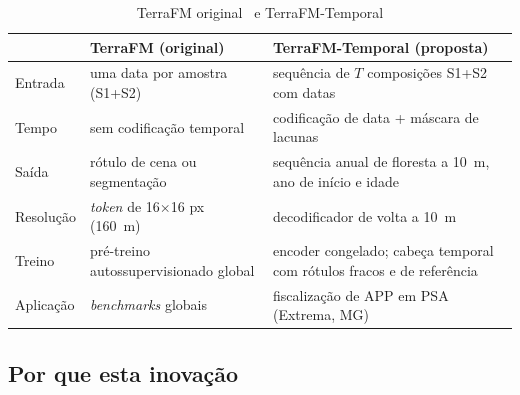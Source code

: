 \documentclass[conference]{IEEEtran}
\begin{document}
\begin{table}[htbp]
\caption{TerraFM original~\citep{danish2026terrafm} e TerraFM-Temporal}
\begin{center}
\footnotesize
\begin{tabular}{|p{1.55cm}|p{2.85cm}|p{2.85cm}|}
\hline
 & \textbf{TerraFM (original)} & \textbf{TerraFM-Temporal (proposta)} \\
\hline
Entrada & uma data por amostra (S1+S2) & sequência de $T$ composições S1+S2 com datas \\
Tempo & sem codificação temporal & codificação de data + máscara de lacunas \\
Saída & rótulo de cena ou segmentação & sequência anual de floresta a 10~m, ano de início e idade \\
Resolução & \textit{token} de 16$\times$16 px (160~m) & decodificador de volta a 10~m \\
Treino & pré-treino autossupervisionado global & encoder congelado; cabeça temporal com rótulos fracos e de referência \\
Aplicação & \textit{benchmarks} globais & fiscalização de APP em PSA (Extrema, MG) \\
\hline
\end{tabular}
\label{tab:comparacao}
\end{center}
\end{table}

\subsection{Por que esta inovação}
\end{document}
